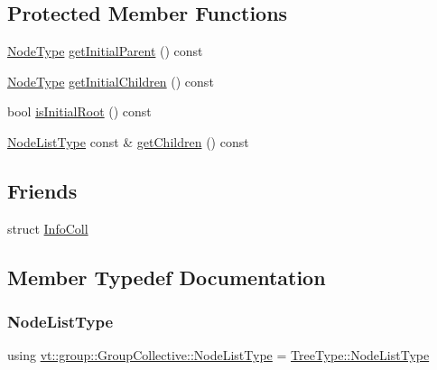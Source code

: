 \subsection*{Protected Member Functions}
\begin{DoxyCompactItemize}
\item 
\hyperlink{namespacevt_a866da9d0efc19c0a1ce79e9e492f47e2}{Node\+Type} \hyperlink{structvt_1_1group_1_1_group_collective_ac8af818af1d4d5c340690bafcdd733d6}{get\+Initial\+Parent} () const
\item 
\hyperlink{namespacevt_a866da9d0efc19c0a1ce79e9e492f47e2}{Node\+Type} \hyperlink{structvt_1_1group_1_1_group_collective_a6687873bb6e1cdb738fa037d415c2873}{get\+Initial\+Children} () const
\item 
bool \hyperlink{structvt_1_1group_1_1_group_collective_a7886a22a287c1a14ec107bdfc38d297e}{is\+Initial\+Root} () const
\item 
\hyperlink{structvt_1_1group_1_1_group_collective_a24ad1fd43cf03d5026de910d85c7ac96}{Node\+List\+Type} const  \& \hyperlink{structvt_1_1group_1_1_group_collective_af8bce31bef936e5a35b6463f26caf461}{get\+Children} () const
\end{DoxyCompactItemize}
\subsection*{Friends}
\begin{DoxyCompactItemize}
\item 
struct \hyperlink{structvt_1_1group_1_1_group_collective_a977ca475df628d7e164bae4a7a97c001}{Info\+Coll}
\end{DoxyCompactItemize}


\subsection{Member Typedef Documentation}
\mbox{\label{structvt_1_1group_1_1_group_collective_a24ad1fd43cf03d5026de910d85c7ac96}} 
\subsubsection{\texorpdfstring{Node\+List\+Type}{NodeListType}}
{\footnotesize\ttfamily using \hyperlink{structvt_1_1group_1_1_group_collective_a24ad1fd43cf03d5026de910d85c7ac96}{vt\+::group\+::\+Group\+Collective\+::\+Node\+List\+Type} =  \hyperlink{structvt_1_1collective_1_1tree_1_1_tree_a834e7b54ea2dceae42db7c5ea859753f}{Tree\+Type\+::\+Node\+List\+Type}}

